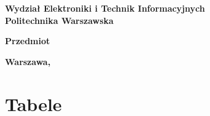 \makeatletter
\renewcommand{\maketitle}{\begin{titlepage}
\begin{center}{\LARGE {\bf
Wydział Elektroniki i Technik Informacyjnych}}\\
\vspace{0.4cm}
{\LARGE {\bf Politechnika Warszawska}}\\
\vspace{0.3cm}
\end{center}
\vspace{5cm}
\begin{center}
{\bf \LARGE Przedmiot \vskip 0.1cm}
\end{center}
\vspace{1cm}
\begin{center}
{\bf \LARGE \@title \vskip 0.1cm}
\end{center}
\vspace{2cm}
\begin{center}
{\bf \Large \@author \par}
\end{center}
\vspace*{\stretch{6}}
\begin{center}
\bf{\large{Warszawa, \@date\vskip 0.1cm}}
\end{center}
\end{titlepage}
}
\makeatother

\maketitle

\tableofcontents









\chapter{Tabele}
